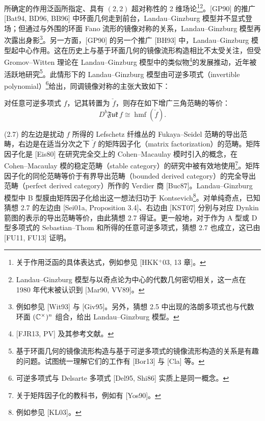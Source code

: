 %

\noindent 所确定的作用泛函所指定、具有 $(2,2)$ 超对称性的 2 维场论\footnote{关于作用泛函的具体表达式，例如参见 [HKK$^{+}$03, 13 章]。}\footnote{Landau–Ginzburg 模型与以奇点论为中心的代数几何密切相关，这一点在 1980 年代末被认识到 [Mar90, VV89]。}。[GP90] 的推广 [Bat94, BD96, BB96] 中环面几何走到前台，Landau–Ginzburg 模型并不显式登场；但通过与外围的环面 Fano 流形的镜像对称的关系，Landau–Ginzburg 模型再次露出身影\footnote{例如参见 [Wit93] 与 [Giv95]。另外，猜想 2.5 中出现的洛朗多项式也与代数环面 $(\mathbb{C}^{\times})^n$ 组合，给出 Landau–Ginzburg 模型。}。另一方面，[GP90] 的另一个推广 [BH93] 中，Landau–Ginzburg 模型起中心作用。这在历史上与基于环面几何的镜像流形构造相比不太受关注，但受 Gromov–Witten 理论在 Landau–Ginzburg 模型中的类似物\footnote{[FJR13, PV] 及其参考文献。}的发展推动，近年被活跃地研究\footnote{基于环面几何的镜像流形构造与基于可逆多项式的镜像流形构造的关系是有趣的问题。试图统一理解它们的工作有 [Bor13] 与 [Cla] 等。}。此情形下的 Landau–Ginzburg 模型由可逆多项式（invertible polynomial）\footnote{可逆多项式与 Delsarte 多项式 [Del95, Shi86] 实质上是同一概念。}给出，同调镜像对称的主张大致如下：

 对任意可逆多项式 $f$，记其转置为 $\check{f}$，则存在如下增广三角范畴的等价：
\begin{equation}
    D^b\mathfrak{Fuk}\,f\cong\operatorname{hmf}(\check{f}). \tag{2.7}
\end{equation}

(2.7) 的左边是扰动 $f$ 所得的 Lefschetz 纤维丛的 Fukaya–Seidel 范畴的导出范畴，右边是在适当分次之下 $\check{f}$ 的矩阵因子化（matrix factorization）的范畴。矩阵因子化是 [Eis80] 在研究完全交上的 Cohen–Macaulay 模时引入的概念，在 Cohen–Macaulay 模的稳定范畴（stable category）的研究中被有效地使用\footnote{关于矩阵因子化的教科书，例如有 [Yos90]。}。矩阵因子化的同伦范畴等价于有界导出范畴（bounded derived category）的完全导出范畴（perfect derived category）所作的 Verdier 商 [Buc87]。Landau–Ginzburg 模型中 B 型膜由矩阵因子化给出这一想法归功于 Kontsevich\footnote{例如参见 [KL03]。}。对单纯奇点，已知猜想 2.7 的左边由 [Sei01a, Proposition 3.4]、右边由 [KST07] 分别与对应 Dynkin 箭图的表示的导出范畴等价，由此猜想 2.7 得证。更一般地，对于作为 A 型或 D 型多项式的 Sebastian–Thom 和所得的任意可逆多项式，猜想 2.7 也成立，这已由 [FU11, FU13] 证明。

